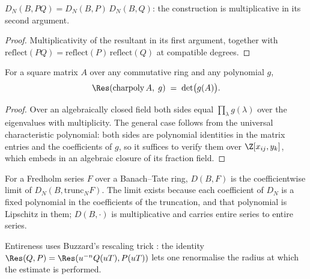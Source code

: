 \begin{lemma}
  \label{lem:dpoly-mul}
  \leanok
  $D_N(B, PQ) = D_N(B,P)\,D_N(B,Q)$: the construction is multiplicative in its second argument.
\end{lemma}

\begin{proof}
  \leanok
  Multiplicativity of the resultant in its first argument, together with
  $\mathrm{reflect}(PQ) = \mathrm{reflect}(P)\,\mathrm{reflect}(Q)$ at compatible degrees.
\end{proof}

\begin{proposition}
  \label{prop:resultant-charpoly}
  \leanok
  For a square matrix $A$ over any commutative ring and any polynomial $g$,
  \[
    \Res(\mathrm{charpoly}\,A,\; g) \;=\; \det\bigl(g(A)\bigr).
  \]
\end{proposition}

\begin{proof}
  \leanok
  Over an algebraically closed field both sides equal $\prod_\lambda g(\lambda)$ over the
  eigenvalues with multiplicity.  The general case follows from the universal characteristic
  polynomial: both sides are polynomial identities in the matrix entries and the coefficients of
  $g$, so it suffices to verify them over $\Z[x_{ij}, y_k]$, which embeds in an algebraic closure
  of its fraction field.
\end{proof}

\begin{definition}
  \label{def:dseries}
  \leanok
  For a Fredholm series $F$ over a Banach--Tate ring, $D(B,F)$ is the coefficientwise limit of
  $D_N(B, \mathrm{trunc}_N F)$.  The limit exists because each coefficient of $D_N$ is a fixed
  polynomial in the coefficients of the truncation, and that polynomial is Lipschitz in them;
  $D(B, \cdot)$ is multiplicative and carries entire series to entire series.
\end{definition}

Entireness uses Buzzard's rescaling trick \cite[p.~21]{Buzzard}: the identity
$\Res(Q,P) = \Res(u^{-n}Q(uT), P(uT))$ lets one renormalise the radius at which the estimate is
performed.

